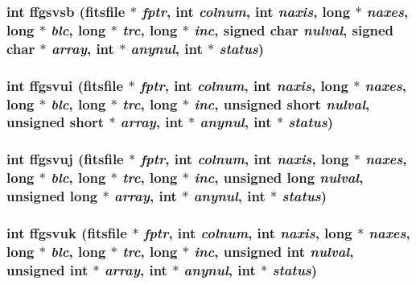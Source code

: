 \subsubsection{\setlength{\rightskip}{0pt plus 5cm}int ffgsvsb (\bf{fitsfile} $\ast$ {\em fptr}, int {\em colnum}, int {\em naxis}, long $\ast$ {\em naxes}, long $\ast$ {\em blc}, long $\ast$ {\em trc}, long $\ast$ {\em inc}, signed char {\em nulval}, signed char $\ast$ {\em array}, int $\ast$ {\em anynul}, int $\ast$ {\em status})}\label{fitsio_8h_9b640c1b98ee1cca47986fc97e10171e}


\subsubsection{\setlength{\rightskip}{0pt plus 5cm}int ffgsvui (\bf{fitsfile} $\ast$ {\em fptr}, int {\em colnum}, int {\em naxis}, long $\ast$ {\em naxes}, long $\ast$ {\em blc}, long $\ast$ {\em trc}, long $\ast$ {\em inc}, unsigned short {\em nulval}, unsigned short $\ast$ {\em array}, int $\ast$ {\em anynul}, int $\ast$ {\em status})}\label{fitsio_8h_87ccfd30c50f2289bde69e5d88519f19}


\subsubsection{\setlength{\rightskip}{0pt plus 5cm}int ffgsvuj (\bf{fitsfile} $\ast$ {\em fptr}, int {\em colnum}, int {\em naxis}, long $\ast$ {\em naxes}, long $\ast$ {\em blc}, long $\ast$ {\em trc}, long $\ast$ {\em inc}, unsigned long {\em nulval}, unsigned long $\ast$ {\em array}, int $\ast$ {\em anynul}, int $\ast$ {\em status})}\label{fitsio_8h_5216e5258326fde9ddb6bc20a82e1070}


\subsubsection{\setlength{\rightskip}{0pt plus 5cm}int ffgsvuk (\bf{fitsfile} $\ast$ {\em fptr}, int {\em colnum}, int {\em naxis}, long $\ast$ {\em naxes}, long $\ast$ {\em blc}, long $\ast$ {\em trc}, long $\ast$ {\em inc}, unsigned int {\em nulval}, unsigned int $\ast$ {\em array}, int $\ast$ {\em anynul}, int $\ast$ {\em status})}\label{fitsio_8h_2c12cc51e3a9ae09a587cad9d58ceb22}


